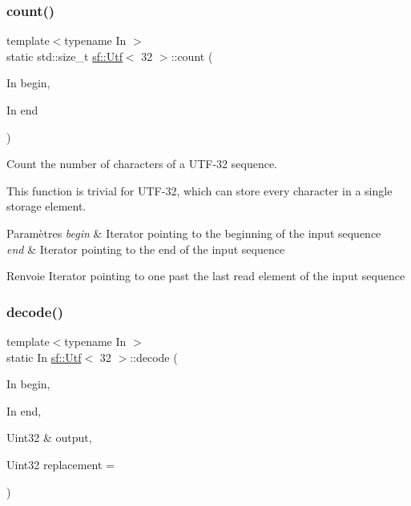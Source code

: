 \subsubsection{\texorpdfstring{count()}{count()}}
{\footnotesize\ttfamily template$<$typename In $>$ \\
static std\+::size\+\_\+t \hyperlink{classsf_1_1Utf}{sf\+::\+Utf}$<$ 32 $>$\+::count (\begin{DoxyParamCaption}\item[{In}]{begin,  }\item[{In}]{end }\end{DoxyParamCaption})\hspace{0.3cm}{\ttfamily [static]}}



Count the number of characters of a U\+T\+F-\/32 sequence. 

This function is trivial for U\+T\+F-\/32, which can store every character in a single storage element.


\begin{DoxyParams}{Paramètres}
{\em begin} & Iterator pointing to the beginning of the input sequence \\
\hline
{\em end} & Iterator pointing to the end of the input sequence\\
\hline
\end{DoxyParams}
\begin{DoxyReturn}{Renvoie}
Iterator pointing to one past the last read element of the input sequence 
\end{DoxyReturn}
\mbox{\label{classsf_1_1Utf_3_0132_01_4_ad754ce8476f7b80563890dec12cefd46}} 
\subsubsection{\texorpdfstring{decode()}{decode()}}
{\footnotesize\ttfamily template$<$typename In $>$ \\
static In \hyperlink{classsf_1_1Utf}{sf\+::\+Utf}$<$ 32 $>$\+::decode (\begin{DoxyParamCaption}\item[{In}]{begin,  }\item[{In}]{end,  }\item[{Uint32 \&}]{output,  }\item[{Uint32}]{replacement = {} }\end{DoxyParamCaption})\hspace{0.3cm}{\ttfamily [static]}}



